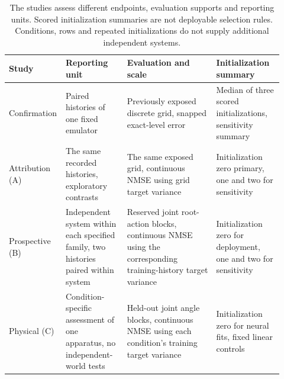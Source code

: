 \begin{table}[ht]
\centering\small
\setlength{\tabcolsep}{3pt}
\begin{tabular}{>{\raggedright\arraybackslash}p{0.14\linewidth}>{\raggedright\arraybackslash}p{0.22\linewidth}>{\raggedright\arraybackslash}p{0.32\linewidth}>{\raggedright\arraybackslash}p{0.24\linewidth}}
\toprule
Study & Reporting unit & Evaluation and scale & Initialization summary\\
\midrule
Confirmation & Paired histories of one fixed emulator & Previously exposed discrete grid, snapped exact-level error & Median of three scored initializations, sensitivity summary\\[4pt]
Attribution (A) & The same recorded histories, exploratory contrasts & The same exposed grid, continuous NMSE using grid target variance & Initialization zero primary, one and two for sensitivity\\[4pt]
Prospective (B) & Independent system within each specified family, two histories paired within system & Reserved joint root-action blocks, continuous NMSE using the corresponding training-history target variance & Initialization zero for deployment, one and two for sensitivity\\[4pt]
Physical (C) & Condition-specific assessment of one apparatus, no independent-world tests & Held-out joint angle blocks, continuous NMSE using each condition's training target variance & Initialization zero for neural fits, fixed linear controls\\
\bottomrule
\end{tabular}
\caption{The studies assess different endpoints, evaluation supports and reporting units. Scored initialization summaries are not deployable selection rules. Conditions, rows and repeated initializations do not supply additional independent systems.}
\label{tab:evaluation-design}
\end{table}
